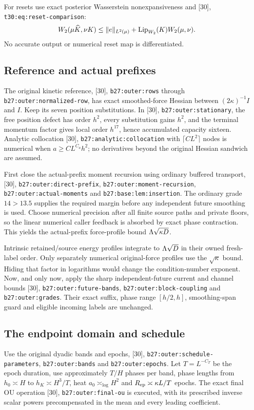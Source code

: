 \documentclass[11pt]{article}
\numberwithin{equation}{section}
\theoremstyle{remark}\newtheorem{remark}[theorem]{Remark}
\newcommand{\norm}[1]{\lVert#1\rVert}
\newcommand{\src}[1]{\texttt{\nolinkurl{#1}}}
\newcommand{\low}[1]{\textup{[30]}, \src{#1}}
\begin{document}
For resets use exact posterior Wasserstein nonexpansiveness and \low{t30:eq:reset-comparison}:
\[
 W_2(\mu\widehat K,\nu K)
 \le\norm e_{L^2(\mu)}+\Lip_{W_2}(K)W_2(\mu,\nu).
\]
No accurate output or numerical reset map is differentiated.

\subsection{Reference and actual prefixes}
The original kinetic reference, \low{b27:outer:rows} through \src{b27:outer:normalized-row}, has exact smoothed-force Hessian between $(2\kappa)^{-1}I$ and $I$. Keep its seven position substitutions. In \low{b27:outer:stationary}, the free position defect has order $h^2$, every substitution gains $h^2$, and the terminal momentum factor gives local order $h^{17}$, hence accumulated capacity sixteen. Analytic collocation \low{b27:analytic:collocation} with $\lceil CL^2\rceil$ nodes is numerical when $a\ge CL^{C_a}h^2$; no derivatives beyond the original Hessian sandwich are assumed.

First close the actual-prefix moment recursion using ordinary buffered transport, \low{b27:outer:direct-prefix}, \src{b27:outer:moment-recursion}, \src{b27:outer:actual-moments} and \src{b27:base:lem:insertion}. The ordinary grade $14>13.5$ supplies the required margin before any independent future smoothing is used. Choose numerical precision after all finite source paths and private floors, so the linear numerical caller feedback is absorbed by exact phase contraction. This yields the actual-prefix force-profile bound $\Lambda\sqrt{\kappa D}$.

Intrinsic retained/source energy profiles integrate to $\Lambda\sqrt D$ in their owned fresh-label order. Only separately numerical original-force profiles use the $\sqrt\kappa$ bound. Hiding that factor in logarithms would change the condition-number exponent. Now, and only now, apply the sharp independent-future current and channel bounds \low{b27:outer:future-bands}, \src{b27:outer:block-coupling} and \src{b27:outer:grades}. Their exact suffix, phase range $[h/2,h]$, smoothing-span guard and eligible incoming labels are unchanged.

\subsection{The endpoint domain and schedule}
Use the original dyadic bands and epochs, \low{b27:outer:schedule-parameters}, \src{b27:outer:bands} and \src{b27:outer:epochs}. Let $T=L^{-C_T}$ be the epoch duration, use approximately $T/H$ phases per band, phase lengths from $h_0\asymp H$ to $h_K\asymp H^3/T$, heat $a_0\asymp_{\log}H^2$ and $R_{\rm ep}\asymp\kappa L/T$ epochs. The exact final OU operation \low{b27:outer:final-ou} is executed, with its prescribed inverse scalar powers precompensated in the mean and every leading coefficient.
\end{document}

